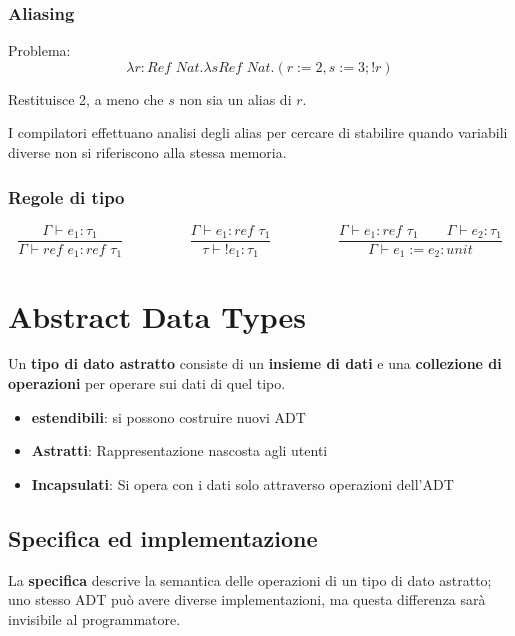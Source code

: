 \documentclass[a4paper,10pt]{article}
\begin{document}
\subsubsection{Aliasing}

Problema: \[\lambda r : Ref\,\,Nat . \lambda s Ref\,\, Nat . (r := 2 , s:=3; !r)\]

Restituisce 2, a meno che $s$ non sia un alias di $r$.\smallskip

I compilatori effettuano analisi degli alias per cercare di stabilire quando variabili diverse non si riferiscono alla stessa memoria.
\subsubsection{Regole di tipo}
\[\dfrac{\Gamma \vdash e_1 : \tau_1}{\Gamma \vdash ref\,\,e_1 : ref\,\,\tau_1} \hspace{2cm} \dfrac{\Gamma \vdash e_1 : ref\,\,\tau_1}{\tau \vdash !e_1 : \tau_1} \hspace{2cm} \dfrac{\Gamma \vdash e_1 : ref\,\, \tau_1 \quad\quad \Gamma \vdash e_2 : \tau_1}{\Gamma \vdash e_1 := e_2 : unit}\]

\newpage
\section{Abstract Data Types}
Un \textbf{tipo di dato astratto} consiste di un \textbf{insieme di dati} e una \textbf{collezione di operazioni} per operare sui dati di quel tipo. 
\begin{itemize}
 \item \textbf{estendibili}: si possono costruire nuovi ADT 
 \item \textbf{Astratti}: Rappresentazione nascosta agli utenti
 \item \textbf{Incapsulati}: Si opera con i dati solo attraverso operazioni dell'ADT
\end{itemize}
\subsection{Specifica ed implementazione}
La \textbf{specifica} descrive la semantica delle operazioni di un tipo di dato astratto; uno stesso ADT può avere diverse implementazioni, ma questa differenza sarà invisibile al programmatore.
\end{document}
